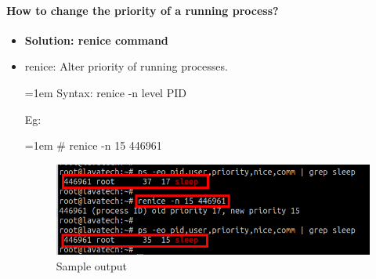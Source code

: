 \begin{flushleft}
\paragraph{How to change the priority of a running process?}
\begin{itemize}
	\item \textbf{Solution: renice command}
	\item renice: Alter priority of running processes.
	\bigskip
	\begin{tcolorbox}[breakable,notitle,boxrule=-0pt,colback=pink,colframe=pink]
		\color{black}
		\font=1em
		Syntax: renice -n level PID
		\font=4pt
	\end{tcolorbox}	
	Eg:
	\bigskip
	\begin{tcolorbox}[breakable,notitle,boxrule=-0pt,colback=black,colframe=black]
		\color{green}
		\font=1em
		\# renice -n 15 446961
		\font=4pt
	\end{tcolorbox}
	\bigskip
	\begin{figure}[h!]
		\centering
		\includegraphics[scale=.5]{content/chapter12/images/renice.png}
		\caption{Sample output}
		\label{fig:cpu58934}
	\end{figure}
	
\end{itemize}




\end{flushleft}

\newpage


